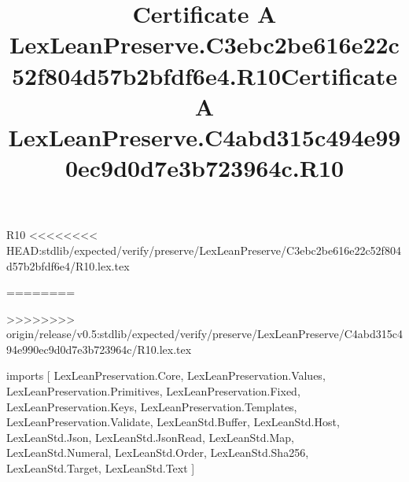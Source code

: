 \begin{lexlean}{R10}
<<<<<<<< HEAD:stdlib/expected/verify/preserve/LexLeanPreserve/C3ebc2be616e22c52f804d57b2bfdf6e4/R10.lex.tex
\title{Certificate A LexLeanPreserve.C3ebc2be616e22c52f804d57b2bfdf6e4.R10}
========
\title{Certificate A LexLeanPreserve.C4abd315c494e990ec9d0d7e3b723964c.R10}
>>>>>>>> origin/release/v0.5:stdlib/expected/verify/preserve/LexLeanPreserve/C4abd315c494e990ec9d0d7e3b723964c/R10.lex.tex
\begin{coremodule}
imports [
  LexLeanPreservation.Core,
  LexLeanPreservation.Values,
  LexLeanPreservation.Primitives,
  LexLeanPreservation.Fixed,
  LexLeanPreservation.Keys,
  LexLeanPreservation.Templates,
  LexLeanPreservation.Validate,
  LexLeanStd.Buffer,
  LexLeanStd.Host,
  LexLeanStd.Json,
  LexLeanStd.JsonRead,
  LexLeanStd.Map,
  LexLeanStd.Numeral,
  LexLeanStd.Order,
  LexLeanStd.Sha256,
  LexLeanStd.Target,
  LexLeanStd.Text
]


\end{coremodule}
\end{lexlean}

